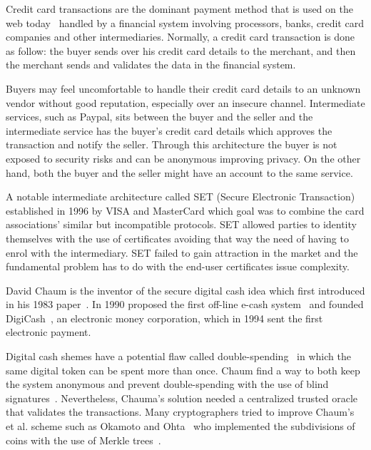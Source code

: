 Credit card transactions are the dominant payment method that is used on the web today~\cite{Narayanan:2016:BCT:2994437} handled by a financial
system involving processors, banks, credit card companies and other intermediaries. Normally, a credit card transaction is done as follow:
the buyer sends over his credit card details to the merchant, and then the merchant sends and validates the data in the financial system.

Buyers may feel uncomfortable to handle their credit card details to an unknown vendor without good reputation, especially over an insecure channel.
Intermediate services, such as Paypal, sits between the buyer and the seller and the intermediate service has the buyer's credit card details which approves
the transaction and notify the seller. Through this architecture the buyer is not exposed to security risks and can be anonymous improving privacy. On the other hand,
both the buyer and the seller might have an account to the same service.

A notable intermediate architecture called SET (Secure Electronic Transaction)~\cite{set} established in 1996 by VISA and MasterCard which goal was to combine the card associations' similar but incompatible protocols. SET allowed parties to identity themselves with the use of
certificates avoiding that way the need of having to enrol with the intermediary. SET failed to gain attraction in the market and the fundamental problem has to do with the end-user certificates issue complexity.

David Chaum is the inventor of the secure digital cash idea which first introduced in his 1983 paper~\cite{Chaum1983}. In 1990 proposed the first off-line e-cash system~\cite{Chaum:1988:UEC:646753.704915} and founded DigiCash~\cite{chaum1983blind}, an electronic money corporation,
which in 1994 sent the first electronic payment.

Digital cash shemes have a potential flaw called double-spending~\cite{10.1007/978-3-662-46803-6_10, 7163021} in which the same digital token can be spent more than once.
Chaum find a way to both keep the system anonymous and prevent double-spending with the use of blind signatures~\cite{Chaum1983,Chaum:1988:UEC:646753.704915}.
Nevertheless, Chauma's solution needed a centralized trusted oracle that validates the transactions. Many cryptographers tried to improve Chaum's et al. scheme such as Okamoto and Ohta~\cite{Watanabe1996} who implemented the subdivisions of coins with the use of Merkle trees~\cite{merkle_tree}.

